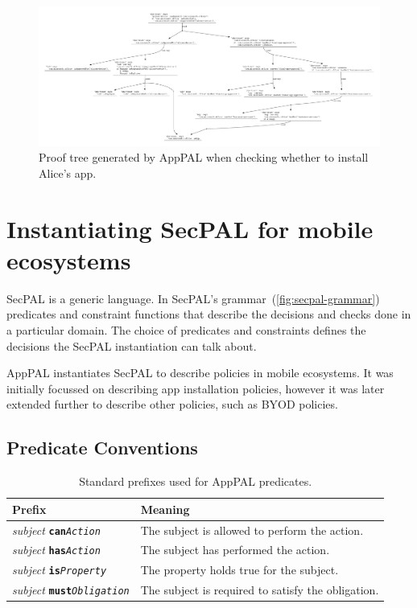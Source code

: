 \documentclass[thesis.tex]{subfiles}
\begin{document}
\begin{figure}
  \centering
  \includegraphics[width=0.9\textheight, angle=90]{figures/exemplar-proof.pdf}
  \caption[Proof tree output by AppPAL]{Proof tree generated by AppPAL when checking whether to install Alice's app.}
  \label{fig:exemplar-proof}
\end{figure}

\section{Instantiating SecPAL for mobile ecosystems}
\label{sec:instantiating}

SecPAL is a generic language.  In SecPAL's
grammar~(\autoref{fig:secpal-grammar}) predicates and constraint
functions that describe the decisions and checks done in a particular
domain.  The choice of predicates and constraints defines the
decisions the SecPAL instantiation can talk about.

AppPAL instantiates SecPAL to describe policies in mobile
ecosystems. It was initially focussed on
describing app installation policies, however it was later extended
further to describe other policies, such as \ac{BYOD} policies.

\subsection{Predicate Conventions}
\label{ssec:types}

\newcommand{\descPred}[2]{\emph{subject} \texttt{\textbf{#1}\emph{#2}}}
\begin{table}
  \begin{tabular}{l l}
    \toprule
    Prefix                      & Meaning                                            \\
    \midrule
    \descPred{can}{Action}      & The subject is allowed to perform the action.      \\
    \descPred{has}{Action}      & The subject has performed the action.              \\
    \descPred{is}{Property}     & The property holds true for the subject.           \\
    \descPred{must}{Obligation} & The subject is required to satisfy the obligation. \\
    \bottomrule
  \end{tabular}
  \caption{Standard prefixes used for AppPAL predicates.}
  \label{tab:predicate-prefixes}
\end{table}
\end{document}
